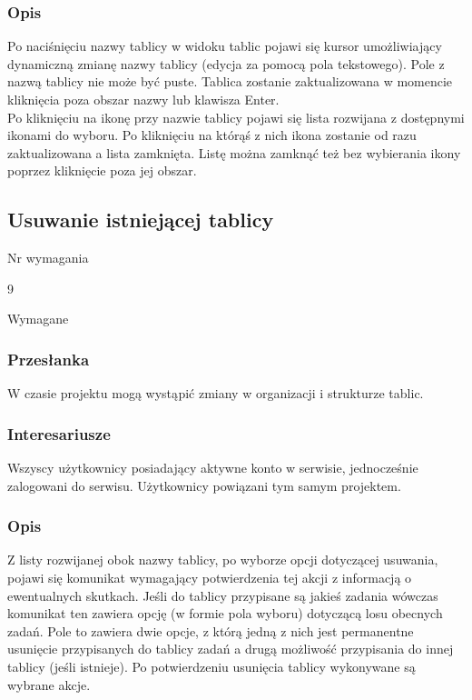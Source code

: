 \documentclass[eng,printmode]{mgr}
\begin{document}
\subsubsection{Opis}
Po naciśnięciu nazwy tablicy w widoku tablic pojawi się kursor umożliwiający dynamiczną zmianę nazwy tablicy (edycja za pomocą pola tekstowego). Pole z nazwą tablicy nie może być puste. Tablica zostanie zaktualizowana w momencie kliknięcia poza obszar nazwy lub klawisza Enter.
\\
Po kliknięciu na ikonę przy nazwie tablicy pojawi się lista rozwijana z dostępnymi ikonami do wyboru. Po kliknięciu na którąś z nich ikona zostanie od razu zaktualizowana a lista zamknięta. Listę można zamknąć też bez wybierania ikony poprzez kliknięcie poza jej obszar.

\subsection{Usuwanie istniejącej tablicy}
\begin{labeling}{Nr wymagania}
\item [Nr wymagania:] 9
\item [Priorytet:] Wymagane
\end{labeling}

\subsubsection{Przesłanka}
W czasie projektu mogą wystąpić zmiany w organizacji i strukturze tablic.

\subsubsection{Interesariusze}
Wszyscy użytkownicy posiadający aktywne konto w serwisie, jednocześnie zalogowani do serwisu. Użytkownicy powiązani tym samym projektem.

\subsubsection{Opis}
Z listy rozwijanej obok nazwy tablicy, po wyborze opcji dotyczącej usuwania, pojawi się komunikat wymagający potwierdzenia tej akcji z informacją o ewentualnych skutkach. Jeśli do tablicy przypisane są jakieś zadania wówczas  komunikat ten zawiera opcję (w formie pola wyboru) dotyczącą losu obecnych zadań. Pole to zawiera dwie opcje, z którą jedną z nich jest permanentne usunięcie przypisanych do tablicy zadań a drugą możliwość przypisania do innej tablicy (jeśli istnieje). Po potwierdzeniu usunięcia tablicy wykonywane są wybrane akcje.
\end{document}
